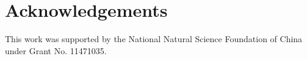 \documentclass[11pt]{article}
\theoremstyle{plain}
\theoremstyle{definition}
\theoremstyle{remark}
\begin{document}





\section*{Acknowledgements}
This work was supported by the National Natural Science Foundation of China under Grant No. 11471035.
\end{document}
